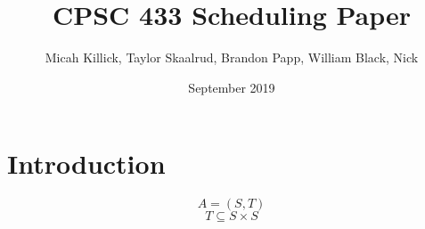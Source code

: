 \documentclass{article}
\title{CPSC 433 Scheduling Paper}
\author{Micah Killick, Taylor Skaalrud, Brandon Papp, William Black, Nick }
\date{September 2019}
\begin{document}
\maketitle

\section{Introduction}

$$A = (S,T) $$
$$T \subseteq S \times S$$
\end{document}
